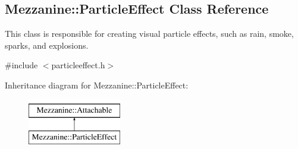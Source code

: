\hypertarget{classMezzanine_1_1ParticleEffect}{
\subsection{Mezzanine::ParticleEffect Class Reference}
\label{classMezzanine_1_1ParticleEffect}
}


This class is responsible for creating visual particle effects, such as rain, smoke, sparks, and explosions.  




{\ttfamily \#include $<$particleeffect.h$>$}

Inheritance diagram for Mezzanine::ParticleEffect:\begin{figure}[H]
\begin{center}
\leavevmode
\includegraphics[height=2.000000cm]{classMezzanine_1_1ParticleEffect}
\end{center}
\end{figure}

